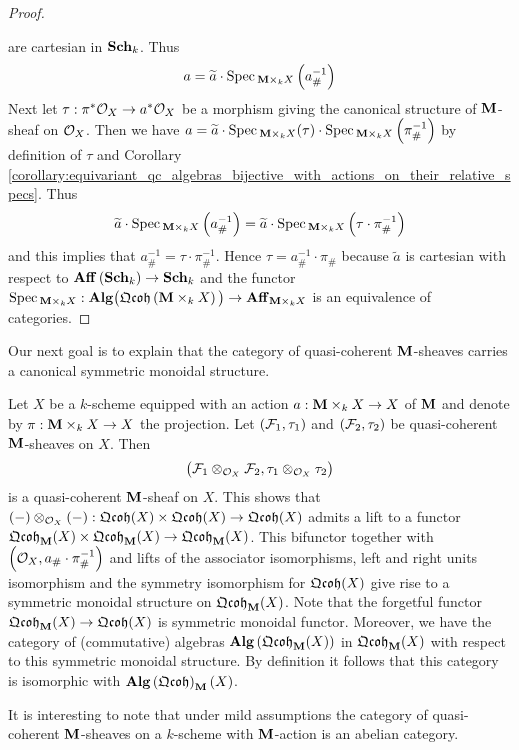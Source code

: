 \begin{proof}
\begin{center}
\end{center}
are cartesian in $\mathbf{Sch}_k$. Thus
$$a = \widetilde{a}\cdot \mathrm{Spec}\,_{\mathbf{M}\times_kX}\left(a_{\#}^{-1}\right)$$
Next let $\tau:\pi^*{\mathcal O}_X\rightarrow a^*{\mathcal O}_X$ be a morphism giving the canonical structure of $\mathbf{M}$-sheaf on ${\mathcal O}_X$. Then we have $a = \widetilde{a}\cdot \mathrm{Spec}\,_{\mathbf{M}\times_kX}(\tau) \cdot \mathrm{Spec}\,_{\mathbf{M}\times_kX}\left(\pi_{\#}^{-1}\right)$ by definition of $\tau$ and Corollary \ref{corollary:equivariant_qc_algebras_bijective_with_actions_on_their_relative_specs}. Thus
$$\widetilde{a}\cdot \mathrm{Spec}\,_{\mathbf{M}\times_kX}\left(a_{\#}^{-1}\right) = \widetilde{a} \cdot \mathrm{Spec}\,_{\mathbf{M}\times_kX}\left(\tau\cdot \pi_{\#}^{-1}\right)$$
and this implies that $a_{\#}^{-1} = \tau\cdot \pi_{\#}^{-1}$. Hence $\tau = a^{-1}_{\#}\cdot \pi_{\#}$ because $\widetilde{a}$ is cartesian with respect to $\mathbf{Aff}\left(\mathbf{Sch}_k\right)\rightarrow \mathbf{Sch}_k$ and the functor $\mathrm{Spec}\,_{\mathbf{M}\times_kX}:\mathbf{Alg}\big(\mathfrak{Qcoh}\left(\mathbf{M}\times_kX\right)\big)\rightarrow \mathbf{Aff}_{\mathbf{M}\times_kX}$ is an equivalence of categories.
\end{proof}
\noindent
Our next goal is to explain that the category of quasi-coherent $\mathbf{M}$-sheaves carries a canonical symmetric monoidal structure. 

\begin{remark}\label{remark:monoidal_structure_on_equivariant_sheaves}
Let $X$ be a $k$-scheme equipped with an action $a:\mathbf{M}\times_kX\rightarrow X$ of $\mathbf{M}$ and denote by $\pi:\mathbf{M}\times_kX\rightarrow X$ the projection. Let $({\mathcal F}_1,\tau_1)$ and $({\mathcal F}_2,\tau_2)$ be quasi-coherent $\mathbf{M}$-sheaves on $X$. Then 
$$\big({\mathcal F}_1\otimes_{{\mathcal O}_X}{\mathcal F}_2,\tau_1\otimes_{{\mathcal O}_X}\tau_2\big)$$
is a quasi-coherent $\mathbf{M}$-sheaf on $X$. This shows that $(-)\otimes_{{\mathcal O}_X}(-):\mathfrak{Qcoh}(X)\times \mathfrak{Qcoh}(X)\rightarrow \mathfrak{Qcoh}(X)$ admits a lift to a functor $\mathfrak{Qcoh}_{\mathbf{M}}(X)\times \mathfrak{Qcoh}_{\mathbf{M}}(X) \rightarrow \mathfrak{Qcoh}_{\mathbf{M}}(X)$. This bifunctor together with $\left({\mathcal O}_X,a_{\#}\cdot \pi_{\#}^{-1}\right)$ and lifts of the associator isomorphisms, left and right units isomorphism and the symmetry isomorphism for $\mathfrak{Qcoh}(X)$ give rise to a symmetric monoidal structure on $\mathfrak{Qcoh}_{\mathbf{M}}(X)$. Note that the forgetful functor $\mathfrak{Qcoh}_{\mathbf{M}}(X)\rightarrow \mathfrak{Qcoh}(X)$ is symmetric monoidal functor. Moreover, we have the category of (commutative) algebras $\mathbf{Alg}\left(\mathfrak{Qcoh}_{\mathbf{M}}(X)\right)$ in $\mathfrak{Qcoh}_{\mathbf{M}}(X)$ with respect to this symmetric monoidal structure. By definition it follows that this category is isomorphic with $\mathbf{Alg}\left(\mathfrak{Qcoh}\right)_{\mathbf{M}}(X)$.
\end{remark}
\noindent
It is interesting to note that under mild assumptions the category of quasi-coherent $\mathbf{M}$-sheaves on a $k$-scheme with $\mathbf{M}$-action is an abelian category.

